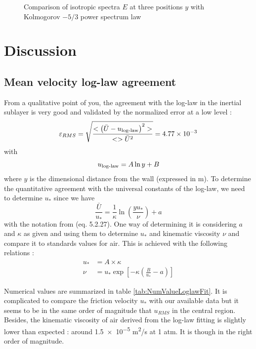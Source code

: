\documentclass[12pt]{article}
\begin{document}
 
 
\begin{figure}
    \centering
    \resizebox{0.6\linewidth}{!}{}
    \caption{Comparison of isotropic spectra $E$ at three positions $y$ with Kolmogorov $-5/3$ power spectrum law}
    \label{fig:F_comparison}
\end{figure}

\section{Discussion}

\subsection{Mean velocity log-law agreement}

From a qualitative point of you, the agreement with the log-law in the inertial sublayer is very good and validated by the normalized error at a low level :\\

\begin{equation}
    \varepsilon_{RMS} = \sqrt{\frac{<\left( \bar{U} - u_{\textnormal{log-law}} \right)^2>}{<>\bar{U}^2}} = \num{4.77e-3}
\end{equation}
with 
\begin{equation}
    u_{\textnormal{log-law}} = A \ln{y} + B
\end{equation}
where $y$ is the dimensional distance from the wall (expressed in \si{m}). To determine the quantitative agreement with the universal constants of the log-law, we need to determine $u_*$ since we have 
\begin{equation}
    \frac{\bar{U}}{u_*} = \frac{1}{\kappa}\ln(\frac{y u_*}{\nu}) + a
\end{equation}
with the notation from \cite{tennekesFirstCourseTurbulence1972} (eq. 5.2.27). One way of determining it is considering $a$ and $\kappa$ as given and using them to determine $u_*$ and kinematic viscosity $\nu$ and compare it to standards values for air. This is achieved with the following relations :
\begin{align}
    u_* &= A\times \kappa \\
    \nu &= u_* \exp \left[ -\kappa\left( \frac{B}{u_*} -a \right) \right]
\end{align}

Numerical values are summarized in table \ref{tab:NumValueLoglawFit}. It is complicated to compare the friction velocity $u_*$ with our available data but it seems to be in the same order of magnitude that $u_{RMS}$ in the central region. Besides, the kinematic viscosity of air derived from the log-law fitting is slightly lower than expected : around \num{1.5e-5} \si{m^2/s} at 1 \si{atm}. It is though in the right order of magnitude.\\
\end{document}
